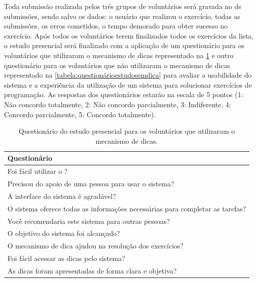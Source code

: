 Toda submissão realizada pelos três grupos de voluntários será gravada no  de submissões, sendo salvo os dados: o usuário que realizou o exercício, todas as submissões, os erros cometidos, o tempo demorado para obter sucesso no exercício. Após todos os voluntários terem finalizados todos os exercícios da lista, o estudo presencial será finalizado com a aplicação de um questionário para os voluntários que utilizaram o mecanismo de dicas representado na \cref{tabela:questionárioestudocomdica} e outro questionário para os voluntários que não utilizaram o mecanismo de dicas representado na \cref{tabela:questionárioestudosemdica} para avaliar a usabilidade do sistema e a experiência da utilização de um sistema  para solucionar exercícios de programação. As respostas dos questionários estarão na escala  de 5 pontos (1: Não concordo totalmente, 2: Não concordo parcialmente, 3: Indiferente, 4: Concordo parcialmente, 5: Concordo totalmente).

\begin{table}[]
	\centering
	\captionsetup{justification=centering}
	\caption{Questionário do estudo presencial para os voluntários que utilizaram o mecanismo de dicas.}
	\label{tabela:questionárioestudocomdica}
	\begin{tabular}{l}
		\hline
		Questionário                        											\\ \hline
		Foi fácil utilizar o \foreign{iHint}?                            				\\
		Precisou do apoio de uma pessoa para usar o sistema?                           	\\
		A interface do sistema é agradável?                        						\\
		O sistema oferece todas as informações necessárias para completar as tarefas?   \\
		Você recomendaria este sistema para outras pessoas?                           	\\
		O objetivo do sistema foi alcançado? 											\\ 
		O mecanismo de dica ajudou na resolução dos exercícios?							\\
		Foi fácil acessar as dicas pelo sistema?										\\
		As dicas foram apresentadas de forma clara e objetiva?  						\\ \hline
	\end{tabular}
\end{table}

